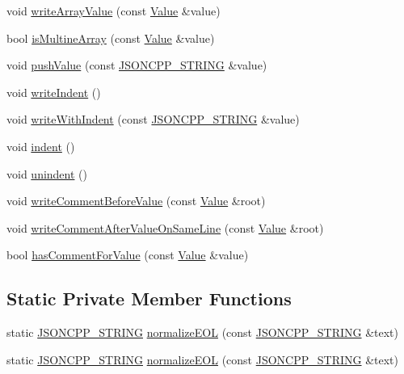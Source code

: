 \begin{DoxyCompactItemize}
\item 
void \hyperlink{class_json_1_1_styled_writer_a0618c23d62965515def15ece1e677f5d}{write\+Array\+Value} (const \hyperlink{class_json_1_1_value}{Value} \&value)
\item 
bool \hyperlink{class_json_1_1_styled_writer_aa5dc671edf10b9976f1511da2271ab9d}{is\+Multine\+Array} (const \hyperlink{class_json_1_1_value}{Value} \&value)
\item 
void \hyperlink{class_json_1_1_styled_writer_a236a833b4bdaa09915c2cac715970f08}{push\+Value} (const \hyperlink{config_8h_a1e723f95759de062585bc4a8fd3fa4be}{J\+S\+O\+N\+C\+P\+P\+\_\+\+S\+T\+R\+I\+NG} \&value)
\item 
void \hyperlink{class_json_1_1_styled_writer_a885f4bfb5701896d60eee6716d2db7e4}{write\+Indent} ()
\item 
void \hyperlink{class_json_1_1_styled_writer_ac38e02972054125c38efbe327b52f6ac}{write\+With\+Indent} (const \hyperlink{config_8h_a1e723f95759de062585bc4a8fd3fa4be}{J\+S\+O\+N\+C\+P\+P\+\_\+\+S\+T\+R\+I\+NG} \&value)
\item 
void \hyperlink{class_json_1_1_styled_writer_a0b65be6186a7c6638270990265e42b97}{indent} ()
\item 
void \hyperlink{class_json_1_1_styled_writer_acee1c9285519b573cfcb00b7e7f5a809}{unindent} ()
\item 
void \hyperlink{class_json_1_1_styled_writer_ad3452c48fabf968bf3693549331ec06e}{write\+Comment\+Before\+Value} (const \hyperlink{class_json_1_1_value}{Value} \&root)
\item 
void \hyperlink{class_json_1_1_styled_writer_ab12b274c62822fc51ec4617c6be95139}{write\+Comment\+After\+Value\+On\+Same\+Line} (const \hyperlink{class_json_1_1_value}{Value} \&root)
\item 
bool \hyperlink{class_json_1_1_styled_writer_a37a806d010f708cb68556f2666f79bdf}{has\+Comment\+For\+Value} (const \hyperlink{class_json_1_1_value}{Value} \&value)
\end{DoxyCompactItemize}
\subsection*{Static Private Member Functions}
\begin{DoxyCompactItemize}
\item 
static \hyperlink{config_8h_a1e723f95759de062585bc4a8fd3fa4be}{J\+S\+O\+N\+C\+P\+P\+\_\+\+S\+T\+R\+I\+NG} \hyperlink{class_json_1_1_styled_writer_a692dda1b1621fb5620e0a7b1b10f3b1f}{normalize\+E\+OL} (const \hyperlink{config_8h_a1e723f95759de062585bc4a8fd3fa4be}{J\+S\+O\+N\+C\+P\+P\+\_\+\+S\+T\+R\+I\+NG} \&text)
\item 
static \hyperlink{config_8h_a1e723f95759de062585bc4a8fd3fa4be}{J\+S\+O\+N\+C\+P\+P\+\_\+\+S\+T\+R\+I\+NG} \hyperlink{class_json_1_1_styled_writer_a692dda1b1621fb5620e0a7b1b10f3b1f}{normalize\+E\+OL} (const \hyperlink{config_8h_a1e723f95759de062585bc4a8fd3fa4be}{J\+S\+O\+N\+C\+P\+P\+\_\+\+S\+T\+R\+I\+NG} \&text)
\end{DoxyCompactItemize}
